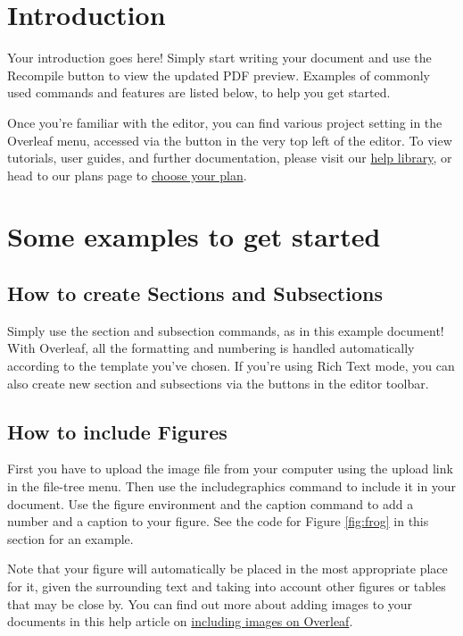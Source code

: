 \documentclass{article}
\begin{document}
\section{Introduction}

Your introduction goes here! Simply start writing your document and use the Recompile button to view the updated PDF preview. Examples of commonly used commands and features are listed below, to help you get started.

Once you're familiar with the editor, you can find various project setting in the Overleaf menu, accessed via the button in the very top left of the editor. To view tutorials, user guides, and further documentation, please visit our \href{https://www.overleaf.com/learn}{help library}, or head to our plans page to \href{https://www.overleaf.com/user/subscription/plans}{choose your plan}.

\section{Some examples to get started}

\subsection{How to create Sections and Subsections}

Simply use the section and subsection commands, as in this example document! With Overleaf, all the formatting and numbering is handled automatically according to the template you've chosen. If you're using Rich Text mode, you can also create new section and subsections via the buttons in the editor toolbar.

\subsection{How to include Figures}

First you have to upload the image file from your computer using the upload link in the file-tree menu. Then use the includegraphics command to include it in your document. Use the figure environment and the caption command to add a number and a caption to your figure. See the code for Figure \ref{fig:frog} in this section for an example.

Note that your figure will automatically be placed in the most appropriate place for it, given the surrounding text and taking into account other figures or tables that may be close by. You can find out more about adding images to your documents in this help article on \href{https://www.overleaf.com/learn/how-to/Including_images_on_Overleaf}{including images on Overleaf}.
\end{document}

